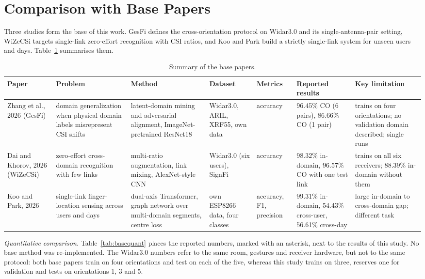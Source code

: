 \documentclass[conference]{IEEEtran}
\begin{document}
\section{Comparison with Base Papers}\label{sec:base}
Three studies form the base of this work. GesFi \cite{zhang2026gesfi} defines the cross-orientation protocol on Widar3.0 and its single-antenna-pair setting, WiZeCSi \cite{dai2026wizecsi} targets single-link zero-effort recognition with CSI ratios, and Koo and Park \cite{koo2026dualaxis} build a strictly single-link system for unseen users and days. Table~\ref{tab:basesum} summarises them.

\begin{table}[t]
\centering
\caption{Summary of the base papers.}
\label{tab:basesum}
\footnotesize
\setlength{\tabcolsep}{3pt}
\begin{tabular}{@{}p{2.0cm}p{2.4cm}p{2.9cm}p{2.2cm}p{1.4cm}p{2.3cm}p{2.8cm}@{}}
\toprule
Paper & Problem & Method & Dataset & Metrics & Reported results & Key limitation \\
\midrule
Zhang et al., 2026 (GesFi) \cite{zhang2026gesfi} & domain generalization when physical domain labels misrepresent CSI shifts & latent-domain mining and adversarial alignment, ImageNet-pretrained ResNet18 & Widar3.0, ARIL, XRF55, own data & accuracy & 96.45\% CO (6 pairs), 86.66\% CO (1 pair) & trains on four orientations; no validation domain described; single runs \\
Dai and Khorov, 2026 (WiZeCSi) \cite{dai2026wizecsi} & zero-effort cross-domain recognition with few links & multi-ratio augmentation, link mixing, AlexNet-style CNN & Widar3.0 (six users), SignFi & accuracy & 98.32\% in-domain, 96.57\% CO with one test link & trains on all six receivers; 88.39\% in-domain without them \\
Koo and Park, 2026 \cite{koo2026dualaxis} & single-link finger-location sensing across users and days & dual-axis Transformer, graph network over multi-domain segments, centre loss \cite{wen2016center} & own ESP8266 data, four classes & accuracy, F1, precision & 99.31\% in-domain, 54.43\% cross-user, 56.61\% cross-day & large in-domain to cross-domain gap; different task \\
\bottomrule
\end{tabular}
\end{table}

\textit{Quantitative comparison.} Table~\ref{tab:basequant} places the reported numbers, marked with an asterisk, next to the results of this study. No base method was re-implemented. The Widar3.0 numbers refer to the same room, gestures and receiver hardware, but not to the same protocol: both base papers train on four orientations and test on each of the five, whereas this study trains on three, reserves one for validation and tests on orientations 1, 3 and 5.
\end{document}
